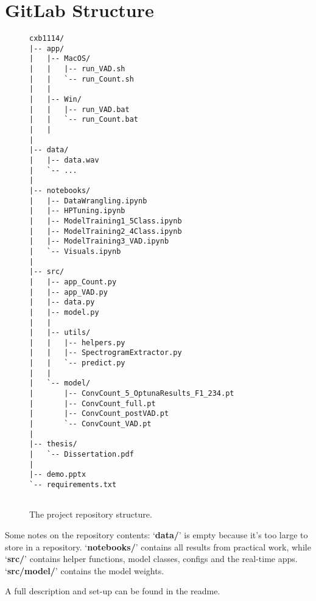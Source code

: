 \chapter{GitLab Structure}
\begin{figure}[H]
\centering
\begin{verbatim}
cxb1114/
|-- app/
|   |-- MacOS/
|   |   |-- run_VAD.sh
|   |   `-- run_Count.sh
|   |
|   |-- Win/
|   |   |-- run_VAD.bat
|   |   `-- run_Count.bat
|   |
|
|-- data/
|   |-- data.wav
|   `-- ...
|
|-- notebooks/
|   |-- DataWrangling.ipynb
|   |-- HPTuning.ipynb
|   |-- ModelTraining1_5Class.ipynb
|   |-- ModelTraining2_4Class.ipynb
|   |-- ModelTraining3_VAD.ipynb
|   `-- Visuals.ipynb
|
|-- src/
|   |-- app_Count.py
|   |-- app_VAD.py
|   |-- data.py
|   |-- model.py
|   |
|   |-- utils/
|   |   |-- helpers.py
|   |   |-- SpectrogramExtractor.py
|   |   `-- predict.py
|   |
|   `-- model/
|       |-- ConvCount_5_OptunaResults_F1_234.pt
|       |-- ConvCount_full.pt
|       |-- ConvCount_postVAD.pt
|       `-- ConvCount_VAD.pt
|
|-- thesis/
|   `-- Dissertation.pdf
|
|-- demo.pptx
`-- requirements.txt


\end{verbatim}
\caption{The project repository structure.}
\end{figure}

Some notes on the repository contents: `\textbf{data/}' is empty because it's too large to store in a repository. `\textbf{notebooks/}' contains all results from practical work, while `\textbf{src/}' contains helper functions, model classes, configs and the real-time apps. `\textbf{src/model/}' contains the model weights.\newline

\noindent A full description and set-up can be found in the readme.
